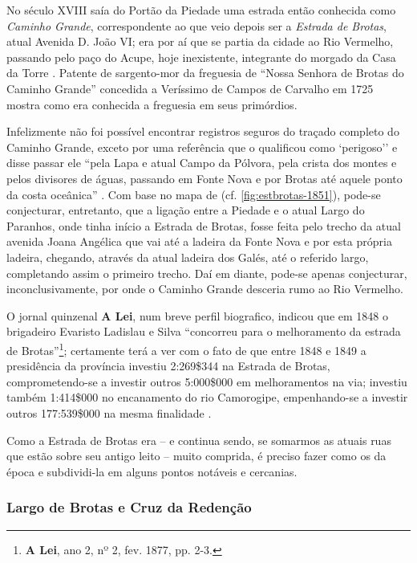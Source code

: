\begin{citacao}
No século XVIII saía do Portão da Piedade uma estrada então conhecida como \textit{Caminho Grande}, correspondente ao que veio depois ser a \textit{Estrada de Brotas}, atual Avenida D. João VI; era por aí que se partia da cidade ao Rio Vermelho, passando pelo paço do Acupe, hoje inexistente, integrante do morgado da Casa da Torre \cite[p.~85]{campos_brotas_1942}. Patente de sargento-mor da freguesia de ``Nossa Senhora de Brotas do Caminho Grande'' concedida a Veríssimo de Campos de Carvalho em 1725 \cite[p.~114]{texmel_manusbn_1896} mostra como era conhecida a freguesia em seus primórdios.

Infelizmente não foi possível encontrar registros seguros do traçado completo do Caminho Grande, exceto por uma referência que o qualificou como `perigoso'' e disse passar ele ``pela Lapa e atual Campo da Pólvora, pela crista dos montes e pelos divisores de águas, passando em Fonte Nova e por Brotas até aquele ponto da costa oceânica'' \cite[p.~488]{sampaio_salvador_2016}. Com base no mapa de  (cf. \autoref{fig:estbrotas-1851}), pode-se conjecturar, entretanto, que a ligação entre a Piedade e o atual Largo do Paranhos, onde tinha início a Estrada de Brotas, fosse feita pelo trecho da atual avenida Joana Angélica que vai até a ladeira da Fonte Nova e por esta própria ladeira, chegando, através da atual ladeira dos Galés, até o referido largo, completando assim o primeiro trecho. Daí em diante, pode-se apenas conjecturar, inconclusivamente, por onde o Caminho Grande desceria rumo ao Rio Vermelho.

O jornal quinzenal \textbf{A Lei}, num breve perfil biografico, indicou que em 1848 o brigadeiro Evaristo Ladislau e Silva ``concorreu para o melhoramento da estrada de Brotas''\footnote{\textbf{A Lei}, ano 2, nº 2, fev. 1877, pp. 2-3.}; certamente terá a ver com o fato de que entre 1848 e 1849 a presidência da província investiu 2:269\$344 na Estrada de Brotas, comprometendo-se a investir outros 5:000\$000 em melhoramentos na via; investiu também 1:414\$000 no encanamento do rio Camorogipe, empenhando-se a investir outros 177:539\$000 na mesma finalidade \cite{bahia_rpe_1849}.

Como a Estrada de Brotas era -- e continua sendo, se somarmos as atuais ruas que estão sobre seu antigo leito -- muito comprida, é preciso fazer como os da época e subdividi-la em alguns pontos notáveis e cercanias.

\subsubsection{Largo de Brotas e Cruz da Redenção}


\end{citacao}
